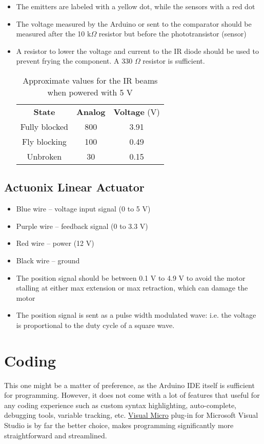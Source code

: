 \documentclass[12pt]{article}
\begin{document}
\begin{itemize}
	\item The emitters are labeled with a yellow dot, while the sensors with a red dot
	\item The voltage measured by the Arduino or sent to the comparator should be measured after the 10 k$\Omega$ resistor but before the phototransistor (sensor)
	\item A resistor to lower the voltage and current to the IR diode should be used to prevent frying the component. A 330 $\Omega$ resistor is sufficient.
	\begin{table}[H]
		\centering
		\begin{tabular}{c | c | c}
			\textbf{State} 	& \textbf{Analog} & \textbf{Voltage} (V) \\ \cline{1-3}
			Fully blocked 	& 800  & 3.91\\
			Fly blocking	& 100  & 0.49\\
			Unbroken 		& 30   & 0.15\\ 
		\end{tabular}
		\caption{Approximate values for the IR beams when powered with 5 V}
		\label{tbl:irstates}
	\end{table}
\end{itemize}

\subsection{Actuonix Linear Actuator}
\begin{itemize}
	\item Blue wire -- voltage input signal (0 to 5 V)
	\item Purple wire -- feedback signal (0 to 3.3 V)
	\item Red wire -- power (12 V)
	\item Black wire -- ground
	\item The position signal should be between 0.1 V to 4.9 V to avoid the motor stalling at either max extension or max retraction, which can damage the motor
	\item The position signal is sent as a pulse width modulated wave: i.e. the voltage is proportional to the duty cycle of a square wave.
\end{itemize}

\section{Coding}
This one might be a matter of preference, as the Arduino IDE itself is sufficient for programming. However, it does not come with a lot of features that useful for any coding experience such as custom syntax highlighting, auto-complete, debugging tools, variable tracking, etc. \href{https://www.visualmicro.com/}{Visual Micro} plug-in for Microsoft Visual Studio is by far the better choice, makes programming significantly more straightforward and streamlined.
\end{document}
